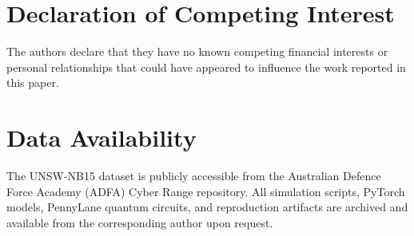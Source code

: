 \documentclass[preprint,12pt]{elsarticle}
\begin{document}
\section*{Declaration of Competing Interest}
The authors declare that they have no known competing financial interests or personal relationships that could have appeared to influence the work reported in this paper.

\section*{Data Availability}
The UNSW-NB15 dataset is publicly accessible from the Australian Defence Force Academy (ADFA) Cyber Range repository. All simulation scripts, PyTorch models, PennyLane quantum circuits, and reproduction artifacts are archived and available from the corresponding author upon request.
\end{document}
